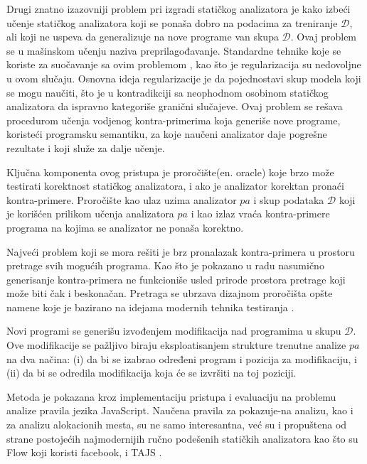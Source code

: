 \documentclass[a4paper]{article}
\theoremstyle{definition}
\begin{document}
{%
Drugi znatno izazovniji problem pri izgradi statičkog analizatora je 
kako izbeći učenje statičkog analizatora koji se ponaša dobro 
na podacima za treniranje $\mathcal{D}$, ali koji ne uspeva da 
generalizuje na nove programe van skupa $\mathcal{D}$. Ovaj problem se u mašinskom 
učenju naziva preprilagođavanje. Standardne tehnike koje se koriste za suočavanje 
sa ovim problemom \cite{statisticalLearningTheory}, kao što je regularizacija su 
nedovoljne u ovom slučaju. Osnovna ideja regularizacije je da pojednostavi skup 
modela koji se mogu naučiti, što je u kontradikciji sa neophodnom osobinom 
statičkog analizatora da ispravno kategoriše granični slučajeve. Ovaj problem 
se rešava procedurom učenja vodjenog kontra-primerima koja generiše nove 
programe, koristeći programsku semantiku, za koje naučeni analizator daje 
pogrešne rezultate i koji služe za dalje učenje. 


Ključna komponenta ovog pristupa je proročište(en. oracle) koje brzo može 
testirati korektnost statičkog analizatora, i ako je analizator korektan 
pronaći kontra-primere. Proročište kao ulaz uzima analizator $pa$ i skup 
podataka $\mathcal{D}$ koji je korišćen prilikom učenja analizatora $pa$ 
i kao izlaz vraća kontra-primere programa na kojima se analizator ne 
ponaša korektno.

Najveći problem koji se mora rešiti je brz pronalazak kontra-primera u prostoru 
pretrage svih mogućih programa. Kao što je pokazano u radu \cite{staticAnalyzer} 
nasumično generisanje kontra-primera ne funkcioniše usled prirode prostora 
pretrage koji može biti čak i beskonačan. Pretraga se ubrzava dizajnom 
proročišta opšte namene koje je bazirano na idejama modernih tehnika testiranja 
\cite{testing}. 

Novi programi se generišu izvođenjem modifikacija nad programima u skupu 
$\mathcal{D}$. Ove modifikacije se pažljivo biraju eksploatisanjem strukture 
trenutne analize $pa$ na dva načina: (i) da bi se izabrao određeni program i 
pozicija za modifikaciju, i (ii) da bi se odredila modifikacija koja će se 
izvršiti na toj poziciji.


Metoda je pokazana kroz implementaciju pristupa i evaluaciju na problemu analize 
pravila jezika JavaScript. Naučena pravila za pokazuje-na analizu, kao i za 
analizu alokacionih mesta, su ne samo interesantna, već su i propuštena od 
strane postojećih najmodernijih ručno podešenih statičkih analizatora kao što 
su Flow \cite{flow} koji koristi facebook, i TAJS \cite{tajs}.

}
\end{document}
